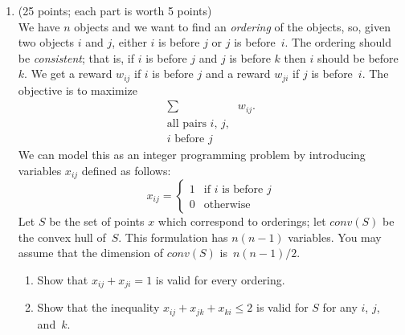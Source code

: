 \documentclass[12pt]{article}
\begin{document}
\begin{enumerate}
   \item (25 points; each part is worth 5 points)  \\
         We have $n$ objects and
         we want to find an {\em ordering} of the objects,
         so, given two objects $i$ and $j$, either $i$ is before $j$
         or $j$ is before~$i$.
         The ordering should be {\em consistent};
         that is, if $i$ is before $j$ and $j$ is before $k$ then $i$ should
         be before~$k$.
         We get a reward $w_{ij}$ if $i$ is before $j$
         and a reward $w_{ji}$ if $j$ is before~$i$.
         The objective is to maximize
         \begin{displaymath}
           \begin{array}{cc}
              \sum  & w_{ij}.  \\
              \mbox{all pairs $i$, $j$,}  &  \\
              \mbox{$i$ before $j$}
           \end{array}
         \end{displaymath}
         We can model this as an integer programming problem by introducing
         variables $x_{ij}$ defined as follows:
         \begin{displaymath}
            x_{ij} = \left\{ \begin{array}{ll}
                        1 & \mbox{if $i$ is before $j$} \\
                        0 & \mbox{otherwise}
                     \end{array}  \right.
         \end{displaymath}
         Let $S$ be the set of points $x$ which correspond to orderings;
         let $conv(S)$ be the convex hull of~$S$.
        This formulation has $n(n-1)$ variables.
        You may assume that the dimension of $conv(S)$ is~$n(n-1)/2$.
         \begin{enumerate}
           \item Show that $x_{ij}+x_{ji}=1$ is valid for every ordering.
              \label{valideq}
           \item Show that the inequality $x_{ij}+x_{jk}+x_{ki}\leq 2$
              is valid for $S$ for any $i$, $j$, and~$k$.   \label{dicycle}

\end{enumerate}
\end{enumerate}
\end{document}
